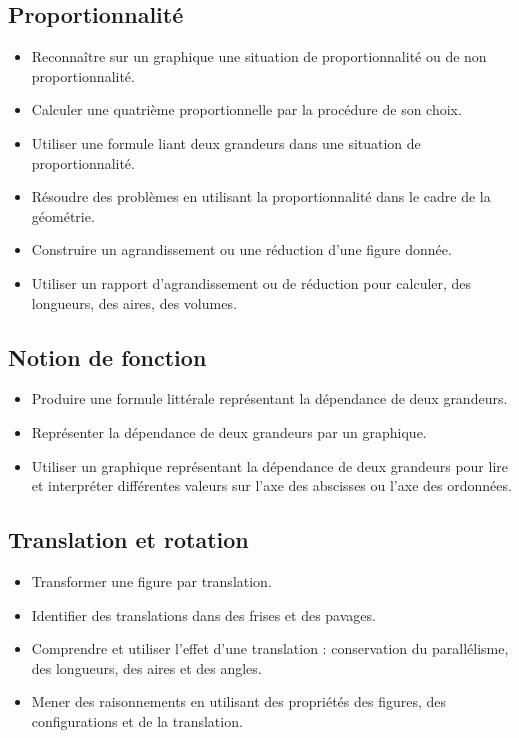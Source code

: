 \documentclass[a4paper,12pt,fleqn]{article}
\begin{document}
\subsection*{Proportionnalité}

\begin{itemize}[itemsep=1em]
	\item {}Reconnaître sur un graphique une situation de proportionnalité ou de non proportionnalité.
	\item {}Calculer une quatrième proportionnelle par la procédure de son choix.
	\item {}Utiliser une formule liant deux grandeurs dans une situation de proportionnalité.
	\item {}Résoudre des problèmes en utilisant la proportionnalité dans le cadre de la géométrie.
	\item {}Construire un agrandissement ou une réduction d’une figure donnée.
	\item {}Utiliser un rapport d’agrandissement ou de réduction pour calculer, des longueurs, des aires, des volumes.
\end{itemize}

\subsection*{Notion de fonction}

\begin{itemize}[itemsep=1em]
	\item {}Produire une formule littérale représentant la dépendance de deux grandeurs.
	\item {}Représenter la dépendance de deux grandeurs par un graphique.
	\item {}Utiliser un graphique représentant la dépendance de deux grandeurs pour lire et interpréter différentes valeurs sur l’axe des abscisses ou l’axe des ordonnées.
\end{itemize}


\newpage


\subsection*{Translation et rotation}

\begin{itemize}[itemsep=1em]
	\item {}Transformer une figure par translation.
	\item {}Identifier des translations dans des frises et des pavages.
	\item {}Comprendre et utiliser l’effet d’une translation : conservation du parallélisme, des longueurs, des aires et des angles.
	\item {}Mener des raisonnements en utilisant des propriétés des figures, des configurations et de la translation.
\end{itemize}
\end{document}
